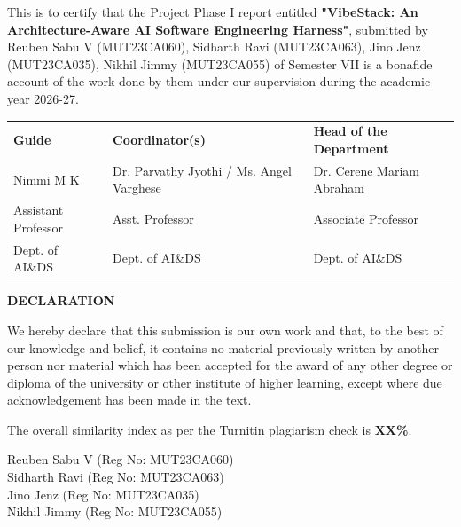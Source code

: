\documentclass[12pt,a4paper]{report}
\begin{document}
This is to certify that the Project Phase I report entitled \textbf{"VibeStack: An Architecture-Aware AI Software Engineering Harness"}, submitted by Reuben Sabu V (MUT23CA060), Sidharth Ravi (MUT23CA063), Jino Jenz (MUT23CA035), Nikhil Jimmy (MUT23CA055) of Semester VII is a bonafide account of the work done by them under our supervision during the academic year 2026-27.

\vspace{3cm}
\begin{center}
\begin{tabular}{p{} p{} p{}}
\textbf{Guide} &
\textbf{Coordinator(s)} &
\textbf{Head of the Department} \\[4pt]

Nimmi M K &
Dr. Parvathy Jyothi / Ms. Angel Varghese  &
Dr. Cerene Mariam Abraham \\

Assistant Professor &
Asst. Professor &
Associate Professor \\

Dept. of AI\&DS &
Dept. of AI\&DS &
Dept. of AI\&DS
\end{tabular}
\end{center}

\newpage
\newpage
{}
\begin{center}
    \Large\textbf{DECLARATION}
\end{center}
\vspace{1cm}

We hereby declare that this submission is our own work and that, to the best of our knowledge and belief, it contains no material previously written by another person nor material which has been accepted for the award of any other degree or diploma of the university or other institute of higher learning, except where due acknowledgement has been made in the text.
\par\vspace{0.5cm}
\noindent
The overall similarity index as per the Turnitin plagiarism check is \textbf{XX\%}.

\vspace{1.5cm}
\noindent Reuben Sabu V (Reg No: MUT23CA060) \\
Sidharth Ravi (Reg No: MUT23CA063) \\
Jino Jenz (Reg No: MUT23CA035) \\
Nikhil Jimmy (Reg No: MUT23CA055) \\
\end{document}
